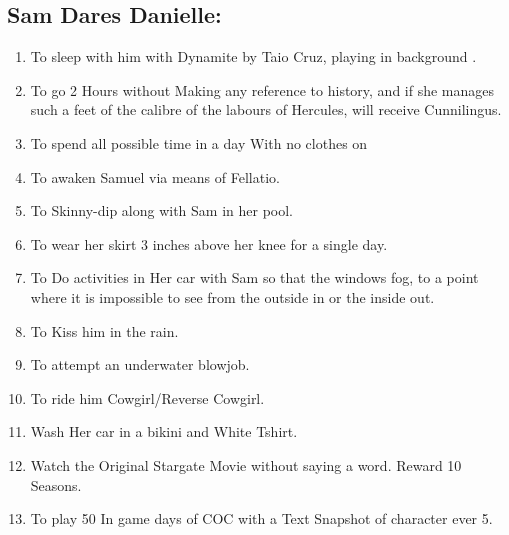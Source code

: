  

  \subsection{Sam Dares Danielle:}

\begin{enumerate}
\item  To sleep with him with Dynamite by Taio Cruz, playing in background .

\item  To go 2 Hours without Making any reference to history, and if she manages such a feet of the calibre of the labours of Hercules, will receive Cunnilingus. 

\item  To spend all possible time in a day With no clothes on

\item  To awaken Samuel via means of Fellatio.

\item  To Skinny-dip along with Sam in her pool.

\item  To wear her skirt 3 inches above her knee for a single day.

\item  To Do activities in Her car with Sam so that the windows fog, to a point where it is impossible to see from the outside in or the inside out.

\item  To Kiss him in the rain.

\item To attempt an underwater blowjob.

\item To ride him Cowgirl/Reverse Cowgirl.

\item Wash Her car in a bikini and White Tshirt.

\item Watch the Original Stargate Movie without saying a word. Reward 10 Seasons.

\item To play 50 In game days of COC with a Text Snapshot of character ever 5.


\end{enumerate}

